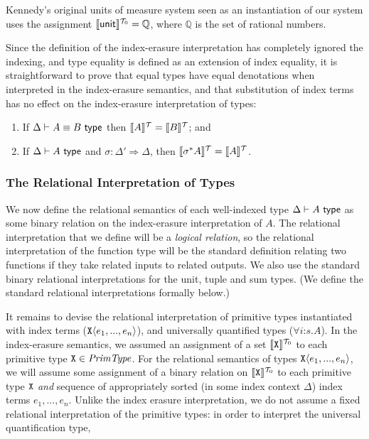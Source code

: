 \begin{example} Kennedy's original units of measure
  system seen as an instantiation of our system uses the assignment
  $\llbracket \mathsf{unit} \rrbracket^{\mathcal{T}_0} = \mathbb{Q}$, where $\mathbb{Q}$ is the
  set of rational numbers.
\end{example}

Since the definition of the index-erasure interpretation has
completely ignored the indexing, and type equality is defined as an
extension of index equality, it is straightforward to prove that equal
types have equal denotations when interpreted in the index-erasure
semantics, and that substitution of index terms has no effect on the
index-erasure interpretation of types:
\begin{lemma}\label{lem:tyeqsubst-erasure}
  \begin{enumerate}
  \item If $\Delta \vdash A \equiv B \textsf{ type}$ then $\llbracket A \rrbracket^{\mathcal{T}} =
    \llbracket B \rrbracket^{\mathcal{T}}$; and
  \item If $\Delta \vdash A \textsf{ type}$ and $\sigma : \Delta' \Rightarrow
    \Delta$, then $\llbracket \sigma^*A \rrbracket^{\mathcal{T}} = \llbracket A \rrbracket^{\mathcal{T}}$.
  \end{enumerate}
\end{lemma}

\subsubsection{The Relational Interpretation of Types}
\label{sec:relational-semantics}

We now define the relational semantics of each well-indexed type
$\Delta \vdash A \textsf{ type}$ as some binary relation on the index-erasure
interpretation of $A$. The relational interpretation that we define
will be a \emph{logical relation}, so the relational interpretation of
the function type will be the standard definition relating two
functions if they take related inputs to related outputs. We also use
the standard binary relational interpretations for the unit, tuple and
sum types. (We define the standard relational interpretations formally
below.)

It remains to devise the relational interpretation of primitive types
instantiated with index terms ($\texttt{X}\langle e_1,...,e_n \rangle$), and
universally quantified types ($\forall i\mathord:s. A$). In the
index-erasure semantics, we assumed an assignment of a set
$\llbracket \texttt{X} \rrbracket^{\mathcal{T}_0}$ to each primitive type $\texttt{X} \in
\mathit{PrimType}$. For the relational semantics of types
$\texttt{X}\langle e_1,...,e_n \rangle$, we will assume some assignment of a binary
relation on $\llbracket \texttt{X} \rrbracket^{\mathcal{T}_0}$ to each primitive type
$\texttt{X}$ \emph{and} sequence of appropriately sorted (in some
index context $\Delta$) index terms $e_1,...,e_n$. Unlike the index
erasure interpretation, we do not assume a fixed relational
interpretation of the primitive types: in order to interpret the
universal quantification type, 

